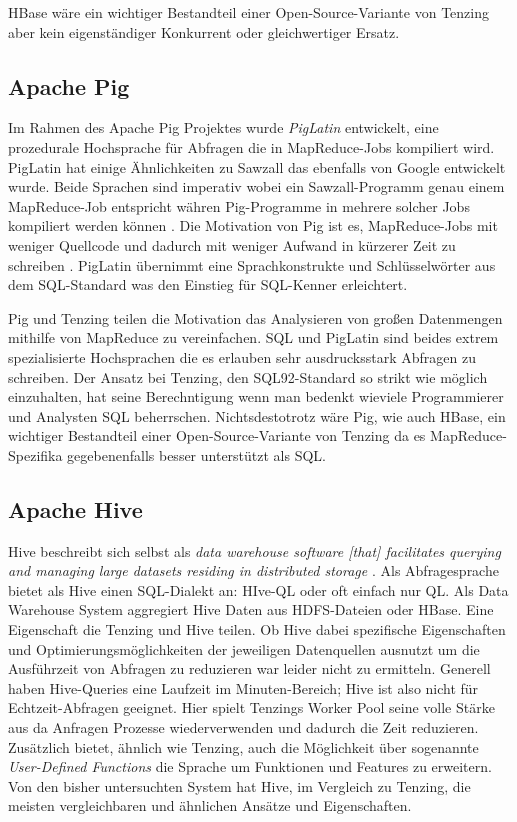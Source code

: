 \documentclass[a4paper]{article}
\begin{document}
HBase wäre ein wichtiger Bestandteil einer Open-Source-Variante von Tenzing aber kein eigenständiger Konkurrent oder gleichwertiger Ersatz.

\subsection{Apache Pig}
Im Rahmen des Apache Pig Projektes wurde \textit{PigLatin} entwickelt, eine prozedurale Hochsprache für Abfragen die in MapReduce-Jobs kompiliert wird. PigLatin hat einige Ähnlichkeiten zu Sawzall \cite{Sawzall} das ebenfalls von Google entwickelt wurde. Beide Sprachen sind imperativ wobei ein Sawzall-Programm genau einem MapReduce-Job entspricht währen Pig-Programme in mehrere solcher Jobs kompiliert werden können \cite{PigWiki}. Die Motivation von Pig ist es, MapReduce-Jobs mit weniger Quellcode und dadurch mit weniger Aufwand in kürzerer Zeit zu schreiben \cite{pdfcast}. PigLatin übernimmt eine Sprachkonstrukte und Schlüsselwörter aus dem SQL-Standard was den Einstieg für SQL-Kenner erleichtert.

Pig und Tenzing teilen die Motivation das Analysieren von großen Datenmengen mithilfe von MapReduce zu vereinfachen. SQL und PigLatin sind beides extrem spezialisierte Hochsprachen die es erlauben sehr ausdrucksstark Abfragen zu schreiben. Der Ansatz bei Tenzing, den SQL92-Standard so strikt wie möglich einzuhalten, hat seine Berechntigung wenn man bedenkt wieviele Programmierer und Analysten SQL beherrschen. Nichtsdestotrotz wäre Pig, wie auch HBase, ein wichtiger Bestandteil einer Open-Source-Variante von Tenzing da es MapReduce-Spezifika gegebenenfalls besser unterstützt als SQL.

\subsection{Apache Hive}
Hive beschreibt sich selbst als \textit{data warehouse software [that] facilitates querying and managing large datasets residing in distributed storage} \cite{HiveWiki}. Als Abfragesprache bietet als Hive einen SQL-Dialekt an: HIve-QL oder oft einfach nur QL. Als Data Warehouse System aggregiert Hive Daten aus HDFS-Dateien oder HBase. Eine Eigenschaft die Tenzing und Hive teilen. Ob Hive dabei spezifische Eigenschaften und Optimierungsmöglichkeiten der jeweiligen Datenquellen ausnutzt um die Ausführzeit von Abfragen zu reduzieren war leider nicht zu ermitteln. Generell haben Hive-Queries eine Laufzeit im Minuten-Bereich; Hive ist also nicht für Echtzeit-Abfragen geeignet. Hier spielt Tenzings Worker Pool seine volle Stärke aus da Anfragen Prozesse wiederverwenden und dadurch die Zeit reduzieren. Zusätzlich bietet, ähnlich wie Tenzing, auch die Möglichkeit über sogenannte \textit{User-Defined Functions} die Sprache um Funktionen und Features zu erweitern. Von den bisher untersuchten System hat Hive, im Vergleich zu Tenzing, die meisten vergleichbaren und ähnlichen Ansätze und Eigenschaften. 
\end{document}
